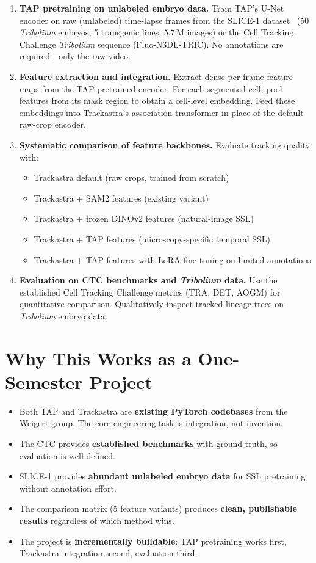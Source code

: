 \documentclass{article}
\begin{document}
\begin{enumerate}
	\item \textbf{TAP pretraining on unlabeled embryo data.} Train TAP's U-Net encoder on raw (unlabeled) time-lapse frames from the SLICE-1 dataset~\cite{slice1} (50 \textit{Tribolium} embryos, 5 transgenic lines, 5.7\,M images) or the Cell Tracking Challenge \textit{Tribolium} sequence (Fluo-N3DL-TRIC). No annotations are required---only the raw video.
	\item \textbf{Feature extraction and integration.} Extract dense per-frame feature maps from the TAP-pretrained encoder. For each segmented cell, pool features from its mask region to obtain a cell-level embedding. Feed these embeddings into Trackastra's association transformer in place of the default raw-crop encoder.
	\item \textbf{Systematic comparison of feature backbones.} Evaluate tracking quality with:
	      \begin{itemize}
		      \item Trackastra default (raw crops, trained from scratch)
		      \item Trackastra + SAM2 features (existing variant)
		      \item Trackastra + frozen DINOv2 features (natural-image SSL)
		      \item Trackastra + TAP features (microscopy-specific temporal SSL)
		      \item Trackastra + TAP features with LoRA fine-tuning on limited annotations
	      \end{itemize}
	\item \textbf{Evaluation on CTC benchmarks and \textit{Tribolium} data.} Use the established Cell Tracking Challenge metrics (TRA, DET, AOGM) for quantitative comparison. Qualitatively inspect tracked lineage trees on \textit{Tribolium} embryo data.
\end{enumerate}

\section*{Why This Works as a One-Semester Project}

\begin{itemize}
	\item Both TAP and Trackastra are \textbf{existing PyTorch codebases} from the Weigert group. The core engineering task is integration, not invention.
	\item The CTC provides \textbf{established benchmarks} with ground truth, so evaluation is well-defined.
	\item SLICE-1 provides \textbf{abundant unlabeled embryo data} for SSL pretraining without annotation effort.
	\item The comparison matrix (5 feature variants) produces \textbf{clean, publishable results} regardless of which method wins.
	\item The project is \textbf{incrementally buildable}: TAP pretraining works first, Trackastra integration second, evaluation third.
\end{itemize}
\end{document}
